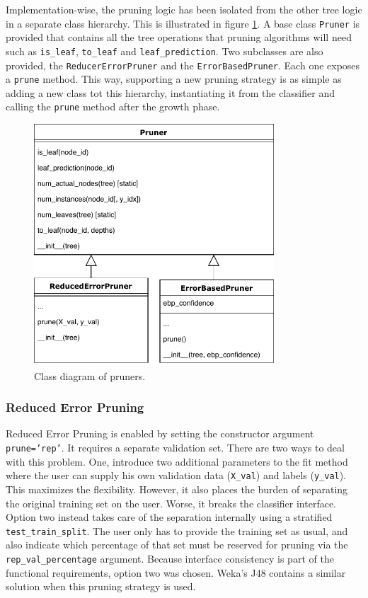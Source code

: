 Implementation-wise, the pruning logic has been isolated from the other tree logic in a separate class hierarchy. This is illustrated in figure \ref{fig:pruner_classes}. A base class \texttt{Pruner} is provided that contains all the tree operations that pruning algorithms will need such as \texttt{is\_leaf}, \texttt{to\_leaf} and \texttt{leaf\_prediction}. Two subclasses are also provided, the \texttt{ReducerErrorPruner} and the \texttt{ErrorBasedPruner}. Each one exposes a \texttt{prune} method. This way, supporting a new pruning strategy is as simple as adding a new class tot this hierarchy, instantiating it from the classifier and calling the \texttt{prune} method after the growth phase.

\begin{figure}[htp]
    \centering
    \includegraphics[width=0.8\textwidth]{img/PrunerClasses.pdf}
    \caption{Class diagram of pruners.}%
    \label{fig:pruner_classes}
\end{figure}

\subsubsection{Reduced Error Pruning}
Reduced Error Pruning is enabled by setting the constructor argument \texttt{prune='rep'}. It requires a separate validation set. There are two ways to deal with this problem. One, introduce two additional parameters to the fit method where the user can supply his own validation data (\texttt{X\_val}) and labels (\texttt{y\_val}). This maximizes the flexibility. However, it also places the burden of separating the original training set on the user. Worse, it breaks the classifier interface. Option two instead takes care of the separation internally using a stratified \texttt{test\_train\_split}. The user only has to provide the training set as usual, and also indicate which percentage of that set must be reserved for pruning via the \texttt{rep\_val\_percentage} argument. Because interface consistency is part of the functional requirements, option two was chosen. Weka's J48 contains a similar solution when this pruning strategy is used.

